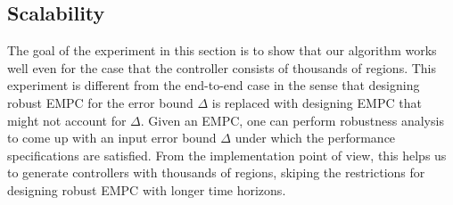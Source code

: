 




\subsection{Scalability}
The goal of the experiment in this section is to show that our algorithm works
well even for the case that the controller consists of thousands of regions.
This experiment is different from the end-to-end case in the sense that
designing robust EMPC for the error bound $\Delta$ is replaced with designing
EMPC that might not account for $\Delta$. Given an EMPC, one can perform
robustness analysis to come up with an input error bound $\Delta$ under which
the performance specifications are satisfied. From the implementation point of
view, this helps us to generate controllers with thousands of regions,
skiping the restrictions for designing robust EMPC with longer time horizons. 

